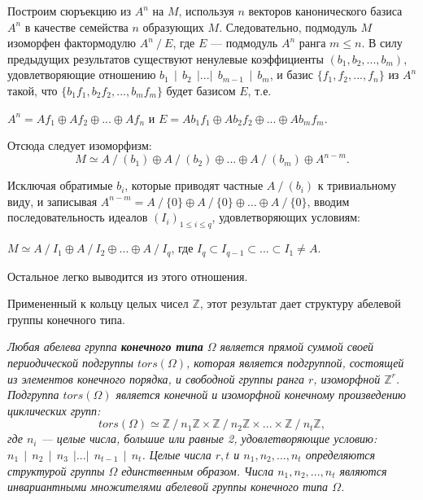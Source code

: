 \newpage
\begin{myproof}
Построим сюръекцию из $A^{n}$ на $M$, используя $n$ векторов канонического базиса $A^{n}$ в качестве семейства $n$ образующих $M$. Следовательно, подмодуль $M$ изоморфен фактормодулю $A^{n} ~/~ E$, где $E$ — подмодуль $A^{n}$ ранга $ m \leqslant n$. В силу предыдущих результатов существуют ненулевые коэффициенты $(b_1, b_2, ..., b_m)$, удовлетворяющие отношению $b_1~~|~~b_2~~|...|~~b_{m-1}~~|~~b_m$, и базис $\{f_1, f_2, ..., f_n\}$ из $A^{n}$ такой, что $\{b_1f_1, b_2f_2,...,b_mf_m\}$ будет базисом $E$, т.е.
\begin{center}
$A^{n} = Af_1 \oplus Af_2 \oplus ... \oplus Af_n$ и $ E = Ab_1f_1 \oplus Ab_2f_2 \oplus ... \oplus Ab_mf_m.$
\end{center}

\noindent Отсюда следует изоморфизм:
$$ M \simeq A ~/~(b_1) \oplus A ~/~(b_2) \oplus ... \oplus A ~/~(b_m) \oplus A^{n-m}. $$

\noindent Исключая обратимые $b_i$, которые приводят частные $A ~/~(b_i)$ к тривиальному виду, и записывая $A^{n-m} = A ~/~ \{0\} \oplus A ~/~ \{0\} \oplus ... \oplus A ~/~ \{0\}$, вводим последовательность идеалов $(I_i)_{1\leqslant i \leqslant q}$, удовлетворяющих условиям:
\begin{center}
$ M \simeq A ~/~ I_1 \oplus A ~/~ I_2 \oplus ... \oplus A ~/~ I_q $, 
где $I_q \subset I_{q-1} \subset ... \subset I_1 \ne A$.
\end{center}

\noindent Остальное легко выводится из этого отношения.
\end{myproof}
Примененный к кольцу целых чисел $\mathbb{Z}$, этот результат дает структуру абелевой группы конечного типа.
\begin{predl}
\hspace*{0.5cm}

\textit{Любая абелева группа \textbf{конечного типа} $\Omega$ является прямой суммой своей периодической подгруппы $tors(\Omega)$, которая является подгруппой, состоящей из элементов конечного порядка, и свободной группы ранга $r$, изоморфной $\mathbb{Z}^r$. Подгруппа $tors(\Omega)$ является конечной и изоморфной конечному произведению циклических групп:}
$$tors(\Omega) \simeq \mathbb{Z} ~/~n_1 \mathbb{Z} \times \mathbb{Z} ~/~n_2 \mathbb{Z} \times ... \times \mathbb{Z} ~/~n_t \mathbb{Z},$$
\noindent \textit{ где $n_i$ — целые числа, большие или равные 2, удовлетворяющие условию: $n_1~~|~~n_2~~|~~n_3~~|...|~~n_{t-1}~~|~~n_t$. Целые числа $r, t$ и $n_1, n_2, ..., n_t$ определяются структурой группы $\Omega$ единственным образом. Числа $n_1, n_2, ..., n_t$ являются инвариантными множителями абелевой группы конечного типа $\Omega$.}
\end{predl}

\newpage
